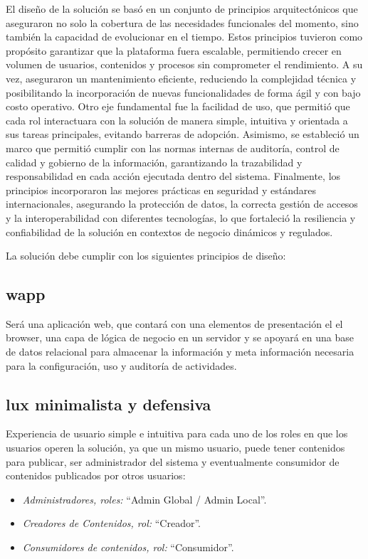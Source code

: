 El diseño de la solución se basó en un conjunto de principios arquitectónicos que aseguraron no solo la cobertura de las necesidades funcionales del momento, sino también la capacidad de evolucionar en el tiempo. Estos principios tuvieron como propósito garantizar que la plataforma fuera escalable, permitiendo crecer en volumen de usuarios, contenidos y procesos sin comprometer el rendimiento. A su vez, aseguraron un mantenimiento eficiente, reduciendo la complejidad técnica y posibilitando la incorporación de nuevas funcionalidades de forma ágil y con bajo costo operativo.
Otro eje fundamental fue la facilidad de uso, que permitió que cada rol interactuara con la solución de manera simple, intuitiva y orientada a sus tareas principales, evitando barreras de adopción. Asimismo, se estableció un marco que permitió cumplir con las normas internas de auditoría, control de calidad y gobierno de la información, garantizando la trazabilidad y responsabilidad en cada acción ejecutada dentro del sistema.
Finalmente, los principios incorporaron las mejores prácticas en seguridad y estándares internacionales, asegurando la protección de datos, la correcta gestión de accesos y la interoperabilidad con diferentes tecnologías, lo que fortaleció la resiliencia y confiabilidad de la solución en contextos de negocio dinámicos y regulados.

La solución debe cumplir con los siguientes principios de diseño:

\subsection{\Gls{wapp}}
\label{principios:webapp}
Será una aplicación web, que contará con una elementos de presentación el el browser, una capa de lógica de negocio en un servidor y se apoyará en una base de datos relacional para almacenar la información y meta información necesaria para la configuración, uso y auditoría de actividades.

\subsection{\gls{lux} minimalista y defensiva}
\label{principios:leanUx}
Experiencia de usuario simple e intuitiva para cada uno de los roles en que los usuarios operen la solución, ya que un mismo usuario, puede tener contenidos para publicar, ser administrador del sistema y eventualmente consumidor de contenidos publicados por otros usuarios:
 \begin{itemize}
 \item \textit{Administradores, roles:} “Admin Global / Admin Local”.
 \item \textit{Creadores de Contenidos, rol:} “Creador”.
 \item \textit{Consumidores de contenidos, rol:} “Consumidor”.
 \end{itemize}

